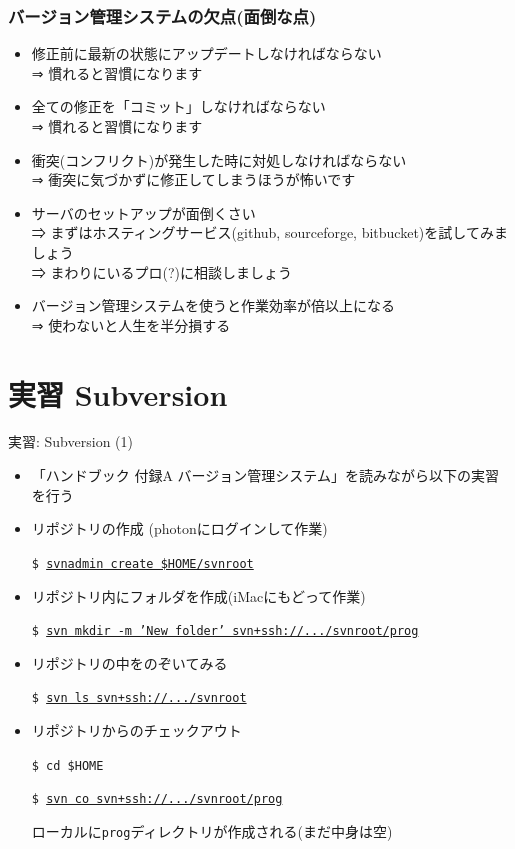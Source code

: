 \documentclass[dvipdfmx]{beamer}
\begin{document}
\begin{frame}
  \frametitle{バージョン管理システムの欠点(面倒な点)}
  \begin{itemize}
  \item 修正前に最新の状態にアップデートしなければならない \\
   ⇒ 慣れると習慣になります
  \item 全ての修正を「コミット」しなければならない \\
    ⇒ 慣れると習慣になります
  \item 衝突(コンフリクト)が発生した時に対処しなければならない \\
    ⇒ 衝突に気づかずに修正してしまうほうが怖いです
  \item サーバのセットアップが面倒くさい \\
    ⇒ まずはホスティングサービス(github, sourceforge, bitbucket)を試してみましょう \\
    ⇒ まわりにいるプロ(?)に相談しましょう \\[.5em]
  \item バージョン管理システムを使うと作業効率が倍以上になる \\
    ⇒ {\color{red} 使わないと人生を半分損する}
  \end{itemize}
\end{frame}

\section{実習 Subversion}

\begin{frame}[t,fragile]{実習: Subversion (1)}
  \begin{itemize}
  \item 「ハンドブック 付録A バージョン管理システム」を読みながら以下の実習を行う
  \item リポジトリの作成 (photonにログインして作業)

    {\tt \$ \underline{svnadmin create \$HOME/svnroot}}
  \item リポジトリ内にフォルダを作成(iMacにもどって作業)

    {\tt \$~\underline{svn mkdir -m 'New folder' svn+ssh://.../svnroot/prog}}
  \item リポジトリの中をのぞいてみる

    {\tt \$ \underline{svn ls svn+ssh://.../svnroot}}

  \item リポジトリからのチェックアウト

    {\tt \$ cd \$HOME}
    
    {\tt \$ \underline{svn co svn+ssh://.../svnroot/prog}}

    ローカルに{\tt prog}ディレクトリが作成される(まだ中身は空)
  \end{itemize}
\end{frame}
\end{document}
